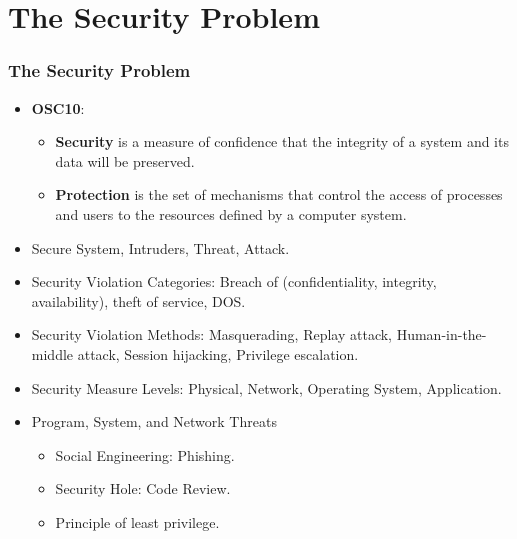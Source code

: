 \documentclass[xcolor=table, notheorems, hyperref={pdfpagelabels=false}]{beamer}
\begin{document}
\section{The Security Problem}
\begin{frame}[fragile]
\frametitle{The Security Problem}
\begin{itemize}
\item \textbf{OSC10}:
\begin{itemize}
\item \textbf{Security} is a measure of confidence that the integrity of 
      a system and its data will be preserved.
\item \textbf{Protection} is the set of mechanisms that control the access
      of processes and users to the resources defined by a computer system.
\end{itemize}
\item Secure System, Intruders, Threat, Attack.
\item Security Violation Categories: Breach of (confidentiality, integrity, 
      availability), theft of service, DOS.
\item Security Violation Methods: Masquerading, Replay attack, 
      Human-in-the-middle attack, Session hijacking, Privilege escalation.
\item Security Measure Levels: Physical, Network, Operating System, Application. 
\item Program, System, and Network Threats
\begin{itemize}
\item Social Engineering: Phishing.
\item Security Hole: Code Review.
\item Principle of least privilege.
\end{itemize}
\end{itemize}
\end{frame}
\end{document}
